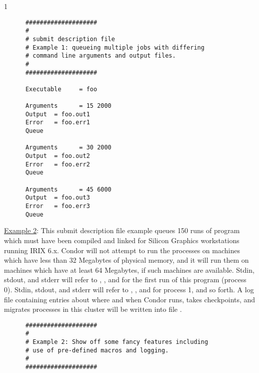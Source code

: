 \begin{ManPage}{\label{man-condor-submit}}{1}
\begin{verbatim}
      ####################
      #
      # submit description file
      # Example 1: queueing multiple jobs with differing
      # command line arguments and output files.
      #                                                                      
      ####################                                                   
                                                                         
      Executable     = foo                                                   
                                                                         
      Arguments      = 15 2000                                               
      Output  = foo.out1                                                     
      Error   = foo.err1
      Queue                                                                  
                                                                         
      Arguments      = 30 2000                                               
      Output  = foo.out2                                                     
      Error   = foo.err2
      Queue                                                                  
                                                                         
      Arguments      = 45 6000                                               
      Output  = foo.out3                                                     
      Error   = foo.err3
      Queue                   
\end{verbatim}

\underline{Example 2}: This submit description file example queues 150
runs of program  which must have been compiled and linked for
Silicon Graphics workstations running IRIX 6.x.
Condor will not attempt
to run the processes on machines which have less than 32 Megabytes of
physical memory, and it will run them on machines which have at least 64
Megabytes, if such machines are available.
Stdin, stdout, and stderr will
refer to , , and  for the first run
of this program (process 0).
Stdin, stdout, and stderr will refer to
, , and  for process 1, and so forth.
A log file containing entries
about where and when Condor runs, takes checkpoints, and migrates processes
in this cluster will be written into file .

\begin{verbatim}
      ####################                                                    
      #                                                                       
      # Example 2: Show off some fancy features including
      # use of pre-defined macros and logging.                                
      #                                                                       
      ####################                                                    
                                                                          

\end{verbatim}
\end{ManPage}
